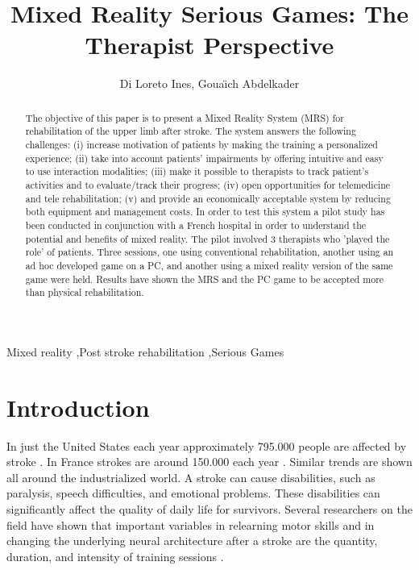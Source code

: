 \documentclass[preprint,authoryear,12pt]{elsarticle}
\begin{document}
\begin{frontmatter}





\title{Mixed Reality Serious Games: The Therapist Perspective}



\author{Di Loreto Ines, Goua\"{\i}ch Abdelkader}

\address{LIRMM, Universit\'e Montpellier 2-CNRS, France}


\begin{abstract}
The objective of this paper is to present a Mixed Reality System (MRS) for rehabilitation of the upper limb after stroke. The system answers the following challenges:
(i) increase motivation of patients by making the training a personalized experience; (ii) take into account patients' impairments by offering intuitive and easy to use interaction modalities; (iii) make it possible to therapists to track patient's activities and to evaluate/track their progress;  (iv) open opportunities for telemedicine and tele rehabilitation; (v) and provide an economically acceptable system by reducing both equipment and management costs.
In order to test this system a pilot study has been conducted in conjunction with a French hospital in order to understand the potential and benefits of mixed reality. The pilot involved 3 therapists who 'played the role' of  patients. Three sessions, one using conventional rehabilitation, another using an ad hoc developed game on a PC, and another using a mixed reality version of the same game were held.  Results have shown the  MRS and the PC game to be accepted more than physical rehabilitation.
\end{abstract}


\begin{keyword}
Mixed reality \sep  Post stroke rehabilitation \sep Serious Games 



\end{keyword}

\end{frontmatter}





\section{Introduction}
\label{Introduction}
In just the United States each year approximately 795.000 people are affected by stroke \citep{diseaseUSA}. In France strokes are around 150.000 each year \citep{diseaseFR}. Similar trends are shown all around the industrialized world. A stroke can cause disabilities, such as paralysis, speech difficulties, and emotional problems. These disabilities can significantly affect the quality of daily life for survivors. Several researchers on the field have shown that important variables in relearning motor skills and in changing the underlying neural architecture after a stroke are the quantity, duration, and intensity of training sessions \citep[for more information see e.g.,][]{Micera2005}. 
\end{document}
